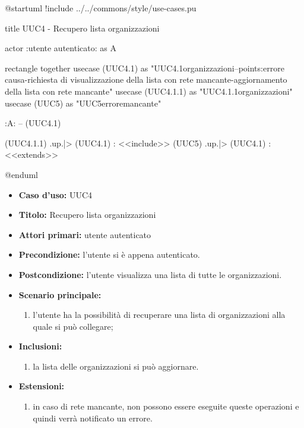 \documentclass[casi-duso]{subfiles}
\begin{document}
\begin{plantuml}
@startuml
!include ../../commons/style/use-cases.pu

title UUC4 - Recupero lista organizzazioni

actor :utente autenticato: as A

rectangle {
  together {
    usecase (UUC4.1) as "UUC4.1\nVisualizzazione\nlista organizzazioni\n--\nExtension points:\nVisualizzazione errore causa\n-richiesta di visualizzazione della lista con rete mancante\n-aggiornamento della lista con rete mancante"
    usecase (UUC4.1.1) as "UUC4.1.1\nAggiornamento\nlista organizzazioni"
    usecase (UUC5) as "UUC5\nVisualizzazione errore\nrete mancante"
  }
}

:A: -- (UUC4.1)

(UUC4.1.1) .up.|> (UUC4.1) : <<include>>
(UUC5) .up.|> (UUC4.1) : <<extends>>

@enduml
\end{plantuml}

\begin{itemize}
  \item \textbf{Caso d’uso:} UUC4
  \item \textbf{Titolo:} Recupero lista organizzazioni
  \item \textbf{Attori primari:} utente autenticato
  \item \textbf{Precondizione:} l'utente si è appena autenticato.
  \item \textbf{Postcondizione:} l'utente visualizza una lista di tutte le organizzazioni.
  \item \textbf{Scenario principale:}
        \begin{enumerate}
          \item l'utente ha la possibilità di recuperare una lista di organizzazioni alla quale si può collegare;
        \end{enumerate}
  \item \textbf{Inclusioni:}
        \begin{enumerate}
          \item la lista delle organizzazioni si può aggiornare.
        \end{enumerate}
  \item \textbf{Estensioni:}
        \begin{enumerate}
          \item in caso di rete mancante, non possono essere eseguite queste operazioni e quindi verrà notificato un errore.
        \end{enumerate}
\end{itemize}
\end{document}

